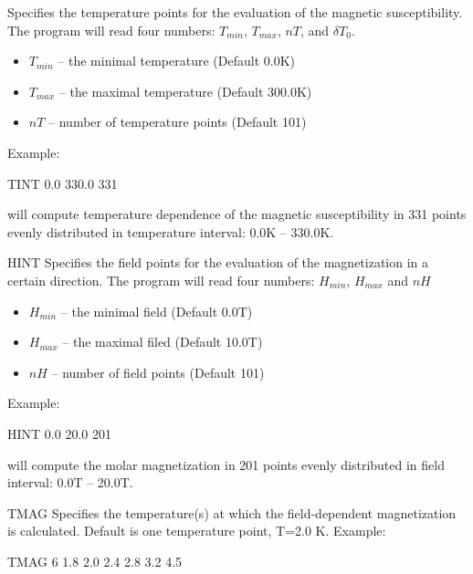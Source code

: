 \begin{keywordlist}
Specifies the temperature points for the evaluation of the magnetic susceptibility. The program will read four numbers: $T_{min}$, $T_{max}$, $nT$, and $\delta T_0$.
\begin{itemize}
 \item $T_{min}$ -- the minimal temperature (Default 0.0K)
 \item $T_{max}$ -- the maximal temperature (Default 300.0K)
 \item $nT$    -- number of temperature points (Default 101)
\end{itemize}
Example:
\begin{inputlisting}
TINT
0.0  330.0  331
\end{inputlisting}
 will compute temperature dependence of the magnetic susceptibility in 331 points evenly distributed in temperature interval: 0.0K -- 330.0K.






\item[HINT]
Specifies the field points for the evaluation of the magnetization in a certain direction. The program will read four numbers: $H_{min}$, $H_{max}$ and $nH$
\begin{itemize}
 \item $H_{min}$ -- the minimal field (Default 0.0T)
 \item $H_{max}$ -- the maximal filed (Default 10.0T)
 \item $nH$    -- number of field points (Default 101)
\end{itemize}
Example:
\begin{inputlisting}
HINT
0.0  20.0  201
\end{inputlisting}
 will compute the molar magnetization in 201 points evenly distributed in field interval: 0.0T -- 20.0T.





\item[TMAG]
Specifies the temperature(s) at which the field-dependent magnetization is calculated. Default is one temperature point, T=2.0 K.
Example:
\begin{inputlisting}
TMAG
6   1.8 2.0 2.4  2.8 3.2 4.5
\end{inputlisting}





\end{keywordlist}
